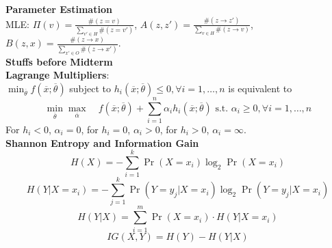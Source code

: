 \documentclass[10pt, letterpaper]{article}
\begin{document}
\begin{multicols*}{2}
\textbf{Parameter Estimation}\\
MLE: $\Pi(v)=\frac{\#(z=v)}{\sum_{v'\in H} \#(z=v')}$, $A(z,z')=\frac{\#(z\rightarrow z')}{\sum_{v\in H} \#(z\rightarrow v)}$,\\
$B(z,x) = \frac{\#(z\rightarrow x)}{\sum_{x'\in O} \#(z\rightarrow x')}$.\\
\textbf{Stuffs before Midterm}\\
\textbf{Lagrange Multipliers}: \\
$\min _{\overline{\theta}}  f(\overline{x} ; \overline{\theta})$ subject to $h_{i}(\overline{x} ; \overline{\theta}) \leq 0, \forall i=1, \ldots, n$ is equivalent to
\vspace{-2.5ex}
\[{\min _{\overline{\theta}} \max _{\overline{\alpha}} \quad f(\overline{x} ; \overline{\theta})+\sum_{i=1}^{n} \alpha_{i} h_{i}(\overline{x} ; \overline{\theta})\text{ s.t. }\alpha_{i} \geq 0, \forall i=1, \dots, n}\]
For $h_i < 0$, $\alpha_i = 0$, for $h_i=0$, $\alpha_i>0$, for $h_i>0$, $\alpha_i=\infty$.\\
\textbf{Shannon Entropy and Information Gain}
\vspace{-2ex}
\[H(X)=-\sum_{i=1}^k \Pr\left(X=x_{i}\right) \log _{2} \Pr\left(X=x_{i}\right)\]
\vspace{-2ex}
\[H(Y|X=x_i)=-\sum_{j=1}^k \Pr\left(Y=y_j|X=x_{i}\right) \log _{2} \Pr\left(Y=y_j|X=x_{i}\right)\]
\vspace{-2ex}
\[H(Y|X) = \sum_{i=1}^m\Pr(X=x_i)\cdot H(Y|X=x_i)\]
\vspace{-2ex}
\[IG(X, Y) = H(Y) - H(Y|X)\]



\end{multicols*}
\end{document}
